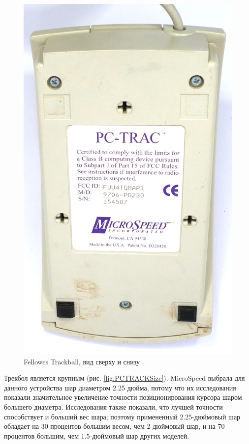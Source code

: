 \documentclass[11pt, a4paper]{article}
\begin{document}
\begin{figure}[h]
    \includegraphics[scale=0.45]{1991_microspeed_pc-track/bottom_60.jpg}
    \caption{Fellowes Trackball, вид сверху и снизу}
    \label{fig:PCTRACKTopBottom}
\end{figure}

Трекбол является крупным (рис. \ref{fig:PCTRACKSize}). MicroSpeed выбрала для данного устройства шар диаметром 2.25 дюйма, потому что их исследования показали значительное увеличение точности позиционирования курсора шаром большего диаметра. Исследования также показали, что лучшей точности способствует и больший вес шара; поэтому примененный 2.25-дюймовый шар обладает на 30 процентов большим весом, чем 2-дюймовый шар, и на 70 процентов большим, чем 1.5-дюймовый шар других моделей.
\end{document}
